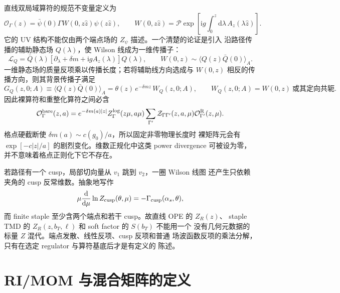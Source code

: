 \documentclass[UTF8,11pt,oneside]{ctexbook}
\newcommand{\dd}{\mathrm{d}}
\begin{document}
直线双局域算符的规范不变量定义为
\begin{equation}
 \mathcal O_\Gamma(z)=\bar\psi(0)\Gamma W(0,z\hat z)\psi(z\hat z),
 \qquad
 W(0,z\hat z)=\mathcal P\exp\left[
 \mathrm{i}g\int_0^z\dd\lambda\,A_z(\lambda\hat z)\right].
 \label{eq:deep-bilocal}
\end{equation}
它的 UV 结构不能仅由两个端点场的 \(Z_\psi\) 描述。一个清楚的论证是引入
沿路径传播的辅助静态场 \(Q(\lambda)\)，使 Wilson 线成为一维传播子：
\begin{equation}
 \mathcal L_Q=\bar Q(\lambda)
 [\partial_\lambda+\delta m+\mathrm{i}gA_z(\lambda)]Q(\lambda),
 \qquad
 W(0,z)\sim\langle Q(z)\bar Q(0)\rangle_A .
 \label{eq:deep-auxiliary-line}
\end{equation}
一维静态场的质量反项乘以传播长度；若将辅助线方向选成与
\(W(0,z)\) 相反的传播方向，则其背景传播子满足
\begin{equation}
 G_Q(z,0;A)\equiv\langle Q(z)\bar Q(0)\rangle_A
 =\theta(z)\,e^{-\delta m z}\,W_Q(z,0;A),
 \qquad W_Q(z,0;A)=W(0,z)\ \text{或其定向共轭}.
 \label{eq:deep-auxiliary-propagator}
\end{equation}
因此裸算符和重整化算符之间必含
\begin{equation}
 \mathcal O_\Gamma^{\rm bare}(z,a)
 =e^{-\delta m(a)|z|}
 Z_\Gamma^{\log}(z\mu,a\mu)
 \sum_{\Gamma'}\mathcal Z_{\Gamma\Gamma'}(z,a,\mu)
 \mathcal O_{\Gamma'}^{\rm R}(z,\mu).
 \label{eq:deep-nonlocal-renorm}
\end{equation}
格点硬截断使 \(\delta m(a)\sim c(g_0)/a\)，所以固定非零物理长度时
裸矩阵元会有 \(\exp[-c|z|/a]\) 的剧烈变化。维数正规化中这类 power
divergence 可被设为零，并不意味着格点正则化下它不存在。

若路径有一个 cusp，局部切向量从 \(v_1\) 跳到 \(v_2\)，一圈 Wilson 线图
还产生只依赖夹角的 cusp 反常维数。抽象地写作
\begin{equation}
 \mu\frac{\dd}{\dd\mu}\ln Z_{\rm cusp}(\theta,\mu)
 =-\Gamma_{\rm cusp}(\alpha_s,\theta),
 \label{eq:deep-cusp-rge}
\end{equation}
而 finite staple 至少含两个端点和若干 cusp。故直线 OPE 的 \(Z_R(z)\)、
staple TMD 的 \(Z_R(z,b_T,\ell)\) 和 soft factor 的 \(S(b_T)\) 不能用一个
没有几何元数据的标量 \(Z\) 混代。端点发散、线性反项、cusp 反项和普通
场波函数反项的乘法分解，只有在选定 regulator 与算符基底后才是有定义的
陈述。

\section{RI/MOM 与混合矩阵的定义}
\end{document}
